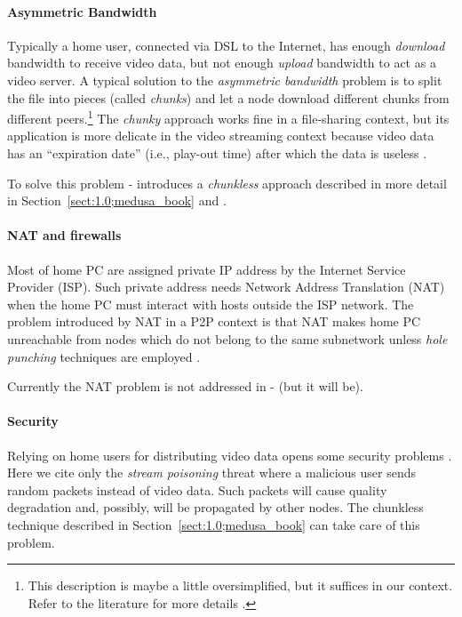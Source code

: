 \documentclass{medusabook}
\begin{document}
\paragraph{Asymmetric Bandwidth}
Typically a home user, connected via DSL to the Internet, has enough
\emph{download} bandwidth to receive video data, but not enough
\emph{upload} bandwidth to act as a video server.  A typical solution
to the \emph{asymmetric bandwidth} problem is to split the file into
pieces (called \emph{chunks}) and let a node download different chunks
from different peers.\footnote{This description is maybe a little
oversimplified, but it suffices in our context.  Refer to the
literature for more details \cite{hei08:_iptv_p2p} \cite{liu08:p2p}.}
The \emph{chunky} approach works fine in a file-sharing context, but
its application is more delicate in the video streaming context
because video data has an ``expiration date'' (i.e., play-out time)
after which the data is useless \cite{liu08:p2p}.

To solve this problem \medusa- introduces a \emph{chunkless} approach
described in more detail in Section~\ref{sect:1.0;medusa_book} and
\cite{bernardini08:dcc08}. 

\paragraph{NAT and firewalls}
Most of home PC are assigned private IP address by the Internet
Service Provider (ISP). Such private address needs Network Address
Translation (NAT) when the home PC must interact with hosts outside
the ISP network.  The problem introduced by NAT in a P2P context is
that NAT makes home PC unreachable from nodes which do not belong to
the same subnetwork unless \emph{hole punching} techniques are
employed \cite{UDP_hole}.

Currently the NAT problem is not addressed in \medusa- (but it will
be).

\paragraph{Security}
Relying on home users for distributing video data opens some security
problems \cite{hei08:_iptv_p2p}.  Here we cite only the \emph{stream
poisoning} threat where a malicious user sends random packets instead
of video data.  Such packets will cause quality degradation and,
possibly, will be propagated by other nodes.  The chunkless technique
described in Section~\ref{sect:1.0;medusa_book} can take care of this
problem. 
\end{document}
